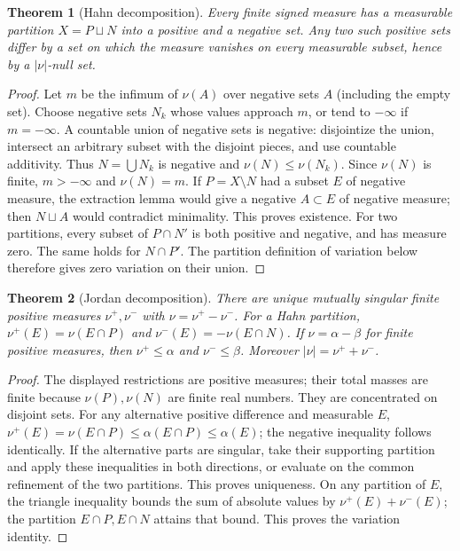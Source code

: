 \documentclass[11pt,oneside,openany]{book}
\newtheorem{theorem}{Theorem}[chapter]
\theoremstyle{definition}
\theoremstyle{remark}
\newcommand{\family}[1]{}
\begin{document}
\begin{theorem}[Hahn decomposition]\family{D11.14.hahn}\label{d11:14:hahn}
Every finite signed measure has a measurable partition $X=P\sqcup N$ into a
positive and a negative set. Any two such positive sets differ by a set on
which the measure vanishes on every measurable subset, hence by a
$|\nu|$-null set.
\end{theorem}
\begin{proof}
Let $m$ be the infimum of $\nu(A)$ over negative sets $A$ (including the empty
set). Choose negative sets $N_k$ whose values approach $m$, or tend to
$-\infty$ if $m=-\infty$. A countable union of negative sets is negative:
disjointize the union, intersect an arbitrary subset with the disjoint pieces,
and use countable additivity. Thus $N=\bigcup N_k$ is negative and
$\nu(N)\leq\nu(N_k)$. Since $\nu(N)$ is finite, $m>-\infty$ and
$\nu(N)=m$. If $P=X\setminus N$ had a subset $E$ of negative measure,
the extraction lemma would give a negative $A\subset E$ of negative measure;
then $N\sqcup A$ would contradict minimality. This proves existence.
For two partitions, every subset of $P\cap N'$ is both positive and negative,
and has measure zero. The same holds for $N\cap P'$. The partition definition
of variation below therefore gives zero variation on their union.
\end{proof}

\begin{theorem}[Jordan decomposition]\family{D11.14.jordan}\label{d11:14:jordan}
There are unique mutually singular finite positive measures
$\nu^+,\nu^-$ with $\nu=\nu^+-\nu^-$. For a Hahn partition,
$\nu^+(E)=\nu(E\cap P)$ and $\nu^-(E)=-\nu(E\cap N)$.
If $\nu=\alpha-\beta$ for finite positive measures, then
$\nu^+\leq\alpha$ and $\nu^-\leq\beta$. Moreover
$|\nu|=\nu^++\nu^-$.
\end{theorem}
\begin{proof}
The displayed restrictions are positive measures; their total masses are
finite because $\nu(P),\nu(N)$ are finite real numbers. They are concentrated
on disjoint sets. For any alternative positive difference and measurable $E$,
$\nu^+(E)=\nu(E\cap P)\leq\alpha(E\cap P)\leq\alpha(E)$;
the negative inequality follows identically. If the alternative parts are
singular, take their supporting partition and apply these inequalities in both
directions, or evaluate on the common refinement of the two partitions.
This proves uniqueness. On any partition of $E$, the triangle inequality
bounds the sum of absolute values by $\nu^+(E)+\nu^-(E)$; the partition
$E\cap P,E\cap N$ attains that bound. This proves the variation identity.
\end{proof}
\end{document}
